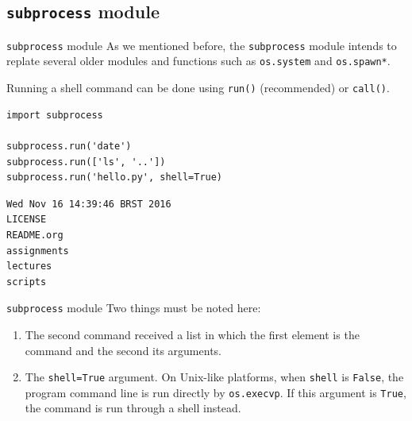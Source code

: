 \documentclass[xcolor=dvipsnames, 10pt, presentation,aspectratio=169]{beamer}
\begin{document}
\subsection{\texttt{subprocess} module}
\label{sec:org0225122}
\begin{frame}[label={sec:org81d6e89},fragile]{\texttt{subprocess} module}
 As we mentioned before, the \texttt{subprocess} module intends to replate
several older modules and functions such as \texttt{os.system} and \texttt{os.spawn*}.

Running a shell command can be done using \texttt{run()} (recommended) or \texttt{call()}.
\lstset{language=Python,label= ,caption= ,captionpos=b,numbers=none}
\begin{lstlisting}
import subprocess

subprocess.run('date')
subprocess.run(['ls', '..'])
subprocess.run('hello.py', shell=True)
\end{lstlisting}

\begin{verbatim}
Wed Nov 16 14:39:46 BRST 2016
LICENSE
README.org
assignments
lectures
scripts
\end{verbatim}
\end{frame}

\begin{frame}[label={sec:org7ab8820},fragile]{\texttt{subprocess} module}
 Two things must be noted here:
\begin{enumerate}
\item The second command received a list in which the first element is
the command and the second its arguments.
\item The \texttt{shell=True} argument. On Unix-like platforms, when \texttt{shell} is
\texttt{False}, the program command line is run directly by \texttt{os.execvp}. If
this argument is \texttt{True}, the command is run through a shell instead.
\end{enumerate}
\end{frame}
\end{document}
